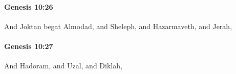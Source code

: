 		\paragraph{Genesis 10:26} %
			\label{GENESIS-10-26}

			And Joktan begat Almodad, and Sheleph, and Hazarmaveth, and Jerah,


		\paragraph{Genesis 10:27} %
			\label{GENESIS-10-27}

			And Hadoram, and Uzal, and Diklah,


